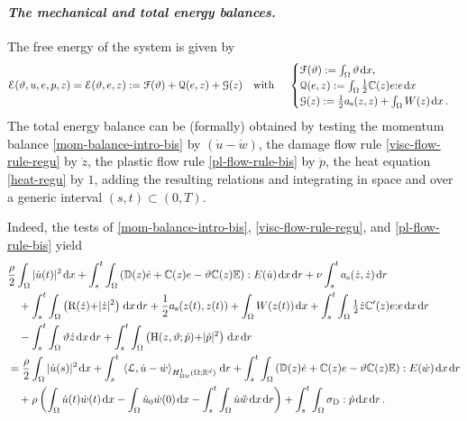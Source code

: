 \documentclass[a4paper,10pt,reqno]{amsart}
\numberwithin{equation}{section}
\newcommand{\R}{\mathbb{R}}
\numberwithin{equation}{section}
\def\calG{{\mathcal G}} \def\calH{{\mathcal H}} \def\calI{{\mathcal I}}
\def\dd{\;\!\mathrm{d}} %
\newcommand{\pairing}[4]{ \sideset{_{ #1 }}{_{ #2 }}  {\mathop{\langle #3 , #4
\rangle}}}
\newcommand{\teta}{\vartheta}
\newcommand{\sig}[1]{E(#1)}
\newcommand{\Dir}{\mathrm{Dir}}
\newcommand{\bbC}{\mathbb{C}}
\newcommand{\bbD}{\mathbb{D}}
\newcommand{\bbE}{\mathbb{E}}
\newcommand{\dev}{\mathrm{D}}
\newcommand{\dip}[3]{\mathrm{H}(#1,#2;#3)}
\newcommand{\did}[1]{\mathrm{R}(#1)}
\newcommand{\ass}{a_{\mathrm{s}}}
\newcommand{\EEE}{\color{black}}
\newcommand{\MMM}{\color{black}}%
\begin{document}
\paragraph{\emph{The mechanical and total energy balances.}}
The \MMM free \EEE  energy of the system is given by 
\begin{equation}
\label{stored-energy}
\calE(\teta, u, e, p,z)= \calE(\teta,e,z):=  \calF(\teta) + \calQ(e,z) + \calG(z) \quad \text{with } \quad \begin{cases} \calF(\teta) : = \int_\Omega  \teta \dd x, 
\\
\calQ(e,z): = 
 \int_\Omega \tfrac12 \bbC(z) e{:} e   \dd x  
 \\
 \calG(z): = 
   \frac12 \ass(z,z)  + \int_\Omega W(z) \dd x\,.
 \end{cases}
\end{equation}
The total energy balance can be (formally) obtained 
by 
 testing the momentum balance \eqref{mom-balance-intro-bis} by $(\dot u {-} \dot w)$,  the damage flow rule 
 \eqref{visc-flow-rule-regu}
   by $\dot z$, 
 the plastic flow rule  \eqref{pl-flow-rule-bis} by $\dot p$, 
 the heat equation \eqref{heat-regu} by $1$,  adding the resulting relations and  integrating in space and over a generic interval $(s,t) \subset (0,T)$.  
 \par
 Indeed, the tests of  \eqref{mom-balance-intro-bis}, \eqref{visc-flow-rule-regu}, and \eqref{pl-flow-rule-bis}  yield
 \begin{equation}
\label{intermediate-mech-enbal}
\begin{aligned}
& 
\frac{\rho}2 \int_\Omega |\dot{u}(t)|^2 \dd x + \int_s^t\int_\Omega \left(  \bbD(z) \dot{e}  + \bbC(z) e - \teta \bbC(z)\bbE \right)  : \sig{\dot{u}} \dd x \dd r +\nu \int_s^t \ass (\dot{z},\dot{z}) \dd r 
\\
& \quad 
+ \int_s^t \int_\Omega \left(   \did {\dot z} {+}  |\dot z|^2  \right) \dd x \dd r +  \frac12 \ass(z(t),z(t)) + \int_\Omega W(z(t)) \dd x +\int_s^t \int_\Omega  \tfrac12 \dot {z}  \bbC'(z) e{:} e \dd x \dd r 
\\
& \quad 
-\int_s^t \int_\Omega \teta \dot z \dd x \dd r
+ \int_s^t \int_\Omega \left(   \dip z{\teta}{\dot p} {+}  |\dot p|^2  \right) \dd x \dd r
\\
&  = \frac{\rho}2 \int_\Omega |\dot{u}(s)|^2 \dd x  + \int_s^t \pairing{}{H_\Dir^1 (\Omega;\R^d)}{\mathcal{L}}{\dot u- \dot w} \dd r  +
\int_s^t \int_\Omega  \left(  \bbD(z) \dot{e}  + \bbC(z) e - \teta \bbC(z) \bbE  \right)  : \sig{\dot w} \dd x \dd r 
\\
&\quad  +\rho \left( \int_\Omega \dot{u}(t) \dot{w}(t) \dd x -  \int_\Omega \dot{u}_0 \dot{w}(0) \dd x - \int_s^t \int_\Omega \dot{u}\ddot w \dd x \dd r \right) +
 \int_s^t \int_\Omega \sigma_\dev : \dot{p} \dd x \dd r\,.
\end{aligned}
\end{equation}
\end{document}
